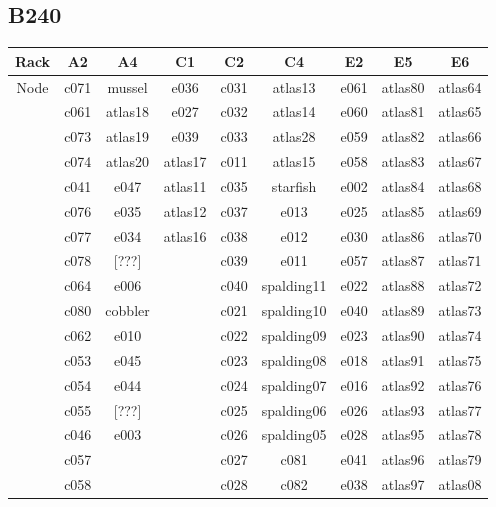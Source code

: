 \documentclass[10pt,letterpaper]{article}
\begin{document}
    \subsection{B240}
        \begin{center}
        \begin{tabular}{ |c|c|c|c|c|c|c|c|c| }
        \hline
        Rack & A2 & A4 & C1 & C2 & C4 & E2 & E5 & E6 \\
        \hline
        \multirow{1}{3em}{Node}

        & c071 & mussel  & e036    & c031 & atlas13    & e061 & atlas80 & atlas64 \\
        & c061 & atlas18 & e027    & c032 & atlas14    & e060 & atlas81 & atlas65 \\
        & c073 & atlas19 & e039    & c033 & atlas28    & e059 & atlas82 & atlas66 \\
        & c074 & atlas20 & atlas17 & c011 & atlas15    & e058 & atlas83 & atlas67 \\
        & c041 & e047    & atlas11 & c035 & starfish   & e002 & atlas84 & atlas68 \\
        & c076 & e035    & atlas12 & c037 & e013       & e025 & atlas85 & atlas69 \\
        & c077 & e034    & atlas16 & c038 & e012       & e030 & atlas86 & atlas70 \\
        & c078 & [???]   &         & c039 & e011       & e057 & atlas87 & atlas71 \\
        & c064 & e006    &         & c040 & spalding11 & e022 & atlas88 & atlas72 \\
        & c080 & cobbler &         & c021 & spalding10 & e040 & atlas89 & atlas73 \\
        & c062 & e010    &         & c022 & spalding09 & e023 & atlas90 & atlas74 \\
        & c053 & e045    &         & c023 & spalding08 & e018 & atlas91 & atlas75 \\
        & c054 & e044    &         & c024 & spalding07 & e016 & atlas92 & atlas76 \\
        & c055 & [???]   &         & c025 & spalding06 & e026 & atlas93 & atlas77 \\
        & c046 & e003    &         & c026 & spalding05 & e028 & atlas95 & atlas78 \\
        & c057 &         &         & c027 & c081       & e041 & atlas96 & atlas79 \\
        & c058 &         &         & c028 & c082       & e038 & atlas97 & atlas08 \\

\end{tabular}
\end{center}
\end{document}

